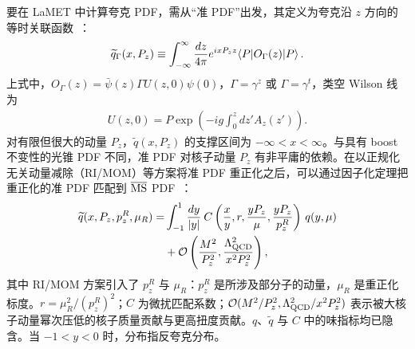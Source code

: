 要在 LaMET 中计算夸克 PDF，需从“准 PDF”出发，其定义为夸克沿 $z$ 方向的等时关联函数~\cite{Ji:2013dva}：
\begin{align}\label{eq:qpdf}
\widetilde{q}_{\Gamma}(x,P_z) \equiv \int_{-\infty}^\infty {dz\over 4\pi} e^{ixP_zz}\langle P |O_{\Gamma}(z)| P \rangle \,.
\end{align}
上式中，$O_{\Gamma}(z)=\bar{\psi}  (z) \Gamma U (z, 0) \psi (0)$，$\Gamma=\gamma^z$ 或 $\Gamma=\gamma^t$，类空 Wilson 线为
\begin{align}
U(z,0) = P\exp\left(-ig\int_0^z dz' A_z(z')\right) .
\end{align}
对有限但很大的动量 $P_z$，$\widetilde{q}(x,P_z)$ 的支撑区间为 $-\infty < x < \infty$。与具有 boost 不变性的光锥 PDF 不同，准 PDF 对核子动量 $P_z$ 有非平庸的依赖。在以正规化无关动量减除（RI/MOM）等方案将准 PDF 重正化之后，可以通过因子化定理把重正化的准 PDF 匹配到 $\overline{\rm MS}$ PDF~\cite{Ji:2013dva,Ji:2014gla,Stewart:2017tvs,Izubuchi:2018srq,Ma:2014jla,Ma:2017pxb}：
\begin{align} \label{eq:fact}
\widetilde{q}(x,P_z, p^R_z,\mu_R)=&\int_{-1}^1 {dy\over |y|}\: C\left({x\over y},r,\frac{yP_z}{\mu},\frac{yP_z}{p_z^R}\right) \, q(y,\mu)\nonumber\\
&+\mathcal{O}\left({M^2\over P_z^2},{\Lambda_{\text{QCD}}^2\over x^2 P_z^2}\right) ,
\end{align}
其中 RI/MOM 方案引入了 $p_z^R$ 与 $\mu_R$：$p_z^R$ 是所涉及部分子的动量，$\mu_R$ 是重正化标度。$r=\mu_R^2/(p_z^R)^2$；$C$ 为微扰匹配系数；$\mathcal{O}(M^2/P_z^2, \Lambda_{\rm QCD}^2/x^2P_z^2)$ 表示被大核子动量幂次压低的核子质量贡献与更高扭度贡献。$q$、$\widetilde{q}$ 与 $C$ 中的味指标均已隐含。当 $-1<y<0$ 时，分布指反夸克分布。

